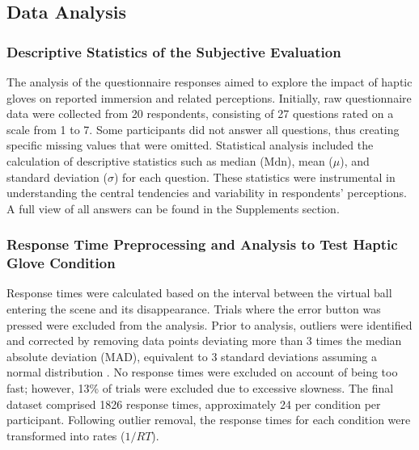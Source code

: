 \documentclass[12pt,oneside,openright]{report}
\begin{document}
\subsection*{Data Analysis}

\subsubsection*{Descriptive Statistics of the Subjective Evaluation}
The analysis of the questionnaire responses aimed to explore the impact of haptic gloves on reported immersion and related perceptions. Initially, raw questionnaire data were collected from 20 respondents, consisting of 27 questions rated on a scale from 1 to 7. Some participants did not answer all questions, thus creating specific missing values that were omitted. Statistical analysis included the calculation of descriptive statistics such as median ($\text{Mdn}$), mean ($\mu$), and standard deviation ($\sigma$) for each question. These statistics were instrumental in understanding the central tendencies and variability in respondents' perceptions. A full view of all answers can be found in the Supplements section.

\subsubsection*{Response Time Preprocessing and Analysis to Test Haptic Glove Condition}

Response times were calculated based on the interval between the virtual ball entering the scene and its disappearance. Trials where the error button was pressed were excluded from the analysis. Prior to analysis, outliers were identified and corrected by removing data points deviating more than 3 times the median absolute deviation (MAD), equivalent to 3 standard deviations assuming a normal distribution \parencite{Innes2019ACA}. No response times were excluded on account of being too fast; however, 13\% of trials were excluded due to excessive slowness. The final dataset comprised 1826 response times, approximately 24 per condition per participant. Following outlier removal, the response times for each condition were transformed into rates ($1/RT$).
\end{document}
